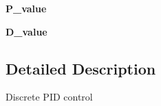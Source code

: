 \begin{DoxyCompactItemize}
\item 
\hypertarget{classplanner__request_1_1pid_1_1_p_i_d_af1f8061b448e78e0c617350f625d432a}{{\bfseries \-P\-\_\-value}}\label{classplanner__request_1_1pid_1_1_p_i_d_af1f8061b448e78e0c617350f625d432a}

\item 
\hypertarget{classplanner__request_1_1pid_1_1_p_i_d_a91db7ce0c35f7429364bab70273f2b0d}{{\bfseries \-D\-\_\-value}}\label{classplanner__request_1_1pid_1_1_p_i_d_a91db7ce0c35f7429364bab70273f2b0d}

\end{DoxyCompactItemize}


\subsection{\-Detailed \-Description}
\begin{DoxyVerb}
Discrete PID control
\end{DoxyVerb}
 

